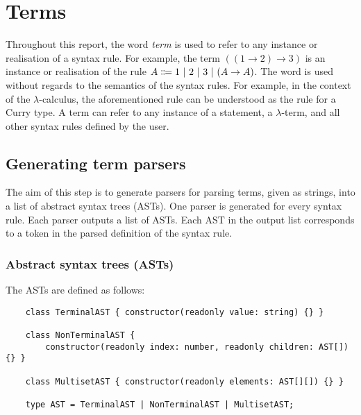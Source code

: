 \chapter{Terms}
\label{chapter:term}
Throughout this report, the word \textit{term} is used to refer to any instance or realisation of a syntax rule. For example, the term $((1 \to 2) \to 3)$ is an instance or realisation of the rule $A \Coloneqq 1 \ |\  2 \ |\  3 \ |\  (A \to A)$. The word is used without regards to the semantics of the syntax rules. For example, in the context of the $\lambda$-calculus, the aforementioned rule can be understood as the rule for a Curry type. A term can refer to any instance of a statement, a $\lambda$-term, and all other syntax rules defined by the user.

\section{Generating term parsers}
The aim of this step is to generate parsers for parsing terms, given as strings, into a list of abstract syntax trees (ASTs). One parser is generated for every syntax rule. Each parser outputs a list of ASTs. Each AST in the output list corresponds to a token in the parsed definition of the syntax rule. 

\subsection{Abstract syntax trees (ASTs)}
The ASTs are defined as follows:
\begin{lstlisting}
    class TerminalAST { constructor(readonly value: string) {} }

    class NonTerminalAST {
        constructor(readonly index: number, readonly children: AST[]) {} }

    class MultisetAST { constructor(readonly elements: AST[][]) {} }

    type AST = TerminalAST | NonTerminalAST | MultisetAST;
\end{lstlisting}

